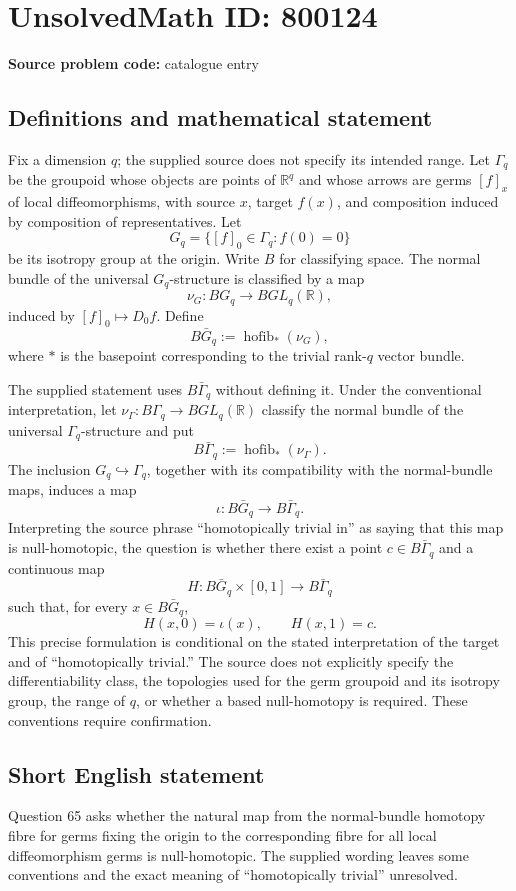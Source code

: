 \documentclass[11pt]{article}
\newcommand{\R}{\mathbb{R}}
\begin{document}
\section*{UnsolvedMath ID: 800124}
\textbf{Source problem code:} catalogue entry
\subsection{Definitions and mathematical statement}
Fix a dimension \(q\); the supplied source does not specify its intended range. Let \(\Gamma_q\) be the groupoid whose objects are points of \(\R^q\) and whose arrows are germs \([f]_x\) of local diffeomorphisms, with source \(x\), target \(f(x)\), and composition induced by composition of representatives. Let
\[
G_q=\{[f]_0\in\Gamma_q:f(0)=0\}
\]
be its isotropy group at the origin. Write \(B\) for classifying space. The normal bundle of the universal \(G_q\)-structure is classified by a map
\[
\nu_G:BG_q\longrightarrow BGL_q(\R),
\]
induced by \([f]_0\mapsto D_0f\). Define
\[
B\bar G_q:=\operatorname{hofib}_{*}(\nu_G),
\]
where \(*\) is the basepoint corresponding to the trivial rank-\(q\) vector bundle.

The supplied statement uses \(B\bar\Gamma_q\) without defining it. Under the conventional interpretation, let \(\nu_\Gamma:B\Gamma_q\to BGL_q(\R)\) classify the normal bundle of the universal \(\Gamma_q\)-structure and put
\[
B\bar\Gamma_q:=\operatorname{hofib}_{*}(\nu_\Gamma).
\]
The inclusion \(G_q\hookrightarrow\Gamma_q\), together with its compatibility with the normal-bundle maps, induces a map
\[
\iota:B\bar G_q\longrightarrow B\bar\Gamma_q.
\]
Interpreting the source phrase ``homotopically trivial in'' as saying that this map is null-homotopic, the question is whether there exist a point \(c\in B\bar\Gamma_q\) and a continuous map
\[
H:B\bar G_q\times[0,1]\longrightarrow B\bar\Gamma_q
\]
such that, for every \(x\in B\bar G_q\),
\[
H(x,0)=\iota(x),\qquad H(x,1)=c.
\]
This precise formulation is conditional on the stated interpretation of the target and of ``homotopically trivial.'' The source does not explicitly specify the differentiability class, the topologies used for the germ groupoid and its isotropy group, the range of \(q\), or whether a based null-homotopy is required. These conventions require confirmation.
\subsection{Short English statement}
Question 65 asks whether the natural map from the normal-bundle homotopy fibre for germs fixing the origin to the corresponding fibre for all local diffeomorphism germs is null-homotopic. The supplied wording leaves some conventions and the exact meaning of ``homotopically trivial'' unresolved.
\end{document}
